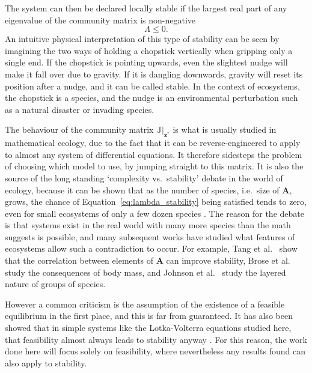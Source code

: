 The system can then be declared locally stable if the largest real part of any eigenvalue of the community matrix is non-negative
\begin{equation}
    \Lambda \leq 0.
    \label{eq:lambda_stability}
\end{equation}
An intuitive physical interpretation of this type of stability can be seen by imagining the two ways of holding a chopstick vertically when gripping only a single end. If the chopstick is pointing upwards, even the slightest nudge will make it fall over due to gravity. If it is dangling downwards, gravity will reset its position after a nudge, and it can be called stable.
In the context of ecosystems, the chopstick is a species, and the nudge is an environmental perturbation such as a natural disaster or invading species.

The behaviour of the community matrix $\mathbb{J}|_\mathbf{z^*}$ is what is usually studied in mathematical ecology, due to the fact that it can be reverse-engineered to apply to almost any system of differential equations. It therefore sidesteps the problem of choosing which model to use, by jumping straight to this matrix.
It is also the source of the long standing `complexity vs.\ stability' debate in the world of ecology, because it can be shown that as the number of species, i.e.\ size of $\mathbf{A}$, grows, the chance of Equation~\eqref{eq:lambda_stability} being satisfied tends to zero, even for small ecosystems of only a few dozen species \cite{May1973}.
The reason for the debate is that systems exist in the real world with many more species than the math suggests is possible, and many subsequent works have studied what features of ecosystems allow such a contradiction to occur.
For example, Tang et al.\ \cite{Tang2014Correlation} show that the correlation between elements of $\mathbf{A}$ can improve stability, Brose et al.\ \cite{Brose2006} study the consequences of body mass, and Johnson et al.\ \cite{Johnson2014} study the layered nature of groups of species.

However a common criticism is the assumption of the existence of a feasible equilibrium in the first place, and this is far from guaranteed. It has also been showed that in simple systems like the Lotka-Volterra equations studied here, that feasibility almost always leads to stability anyway \cite{Dougoud2018}. For this reason, the work done here will focus solely on feasibility, where nevertheless any results found can also apply to stability.


